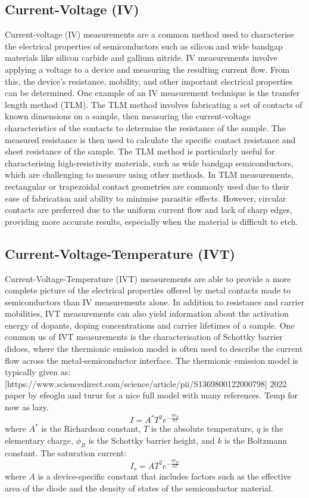 \subsection{Current-Voltage (IV)}
Current-voltage (IV) measurements are a common method used to characterise the electrical properties of semiconductors such as silicon and wide bandgap materials like silicon carbide and gallium nitride. IV measurements involve applying a voltage to a device and measuring the resulting current flow. From this, the device's resistance, mobility, and other important electrical properties can be determined. One example of an IV measurement technique is the transfer length method (TLM). The TLM method involves fabricating a set of contacts of known dimensions on a sample, then measuring the current-voltage characteristics of the contacts to determine the resistance of the sample. The measured resistance is then used to calculate the specific contact resistance and sheet resistance of the sample. The TLM method is particularly useful for characterising high-resistivity materials, such as wide bandgap semiconductors, which are challenging to measure using other methods. In TLM measurements, rectangular or trapezoidal contact geometries are commonly used due to their ease of fabrication and ability to minimise parasitic effects. However, circular contacts are preferred due to the uniform current flow and lack of sharp edges, providing more accurate results, especially when the material is difficult to etch.
\subsection{Current-Voltage-Temperature (IVT)}
Current-Voltage-Temperature (IVT) measurements are able to provide a more complete picture of the electrical properties offered by metal contacts made to semiconductors than IV measurements alone. In addition to resistance and carrier mobilities, IVT measurements can also yield information about the activation energy of dopants, doping concentrations and carrier lifetimes of a sample. One common us of IVT measurements is the characterisation of Schottky barrier didoes, where the thermionic emission model is often used to describe the current flow across the metal-semiconductor interface. The thermionic emission model is typically given as:
[https://www.sciencedirect.com/science/article/pii/S1369800122000798] 2022 paper by efeoglu and turur for a nice full model with many references. Temp for now as lazy.
\begin{equation}
    I = A^* T^2 e^{-\frac{q\phi_B}{kT}}
    \label{eq:thermionic_emission_model_gpt}
\end{equation}
where $A^*$ is the Richardson constant, $T$ is the absolute temperature, $q$ is the elementary charge, $\phi_B$ is the Schottky barrier height, and $k$ is the Boltzmann constant. The saturation current:
\begin{equation}
    I_s = AT^2 e^{-\frac{q\phi_B}{kT}}
    \label{eq:thermionic_saturation_current}
\end{equation}
where $A$ is a device-specific constant that includes factors such as the effective area of the diode and the density of states of the semiconductor material.

